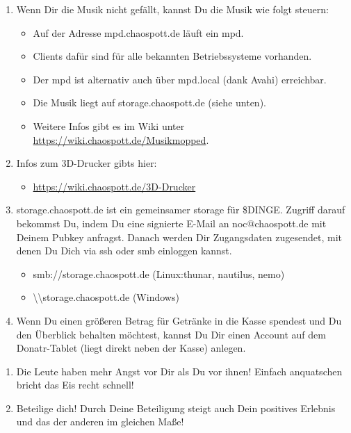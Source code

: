 \begin{enumerate}
	\item Wenn Dir die Musik nicht gefällt, kannst Du die Musik wie folgt steuern:
		\begin{itemize}
		  \item Auf der Adresse mpd.chaospott.de läuft ein mpd.
		  \item Clients dafür sind für alle bekannten Betriebssysteme vorhanden.
		  \item Der mpd ist alternativ auch über mpd.local (dank Avahi) erreichbar.
		  \item Die Musik liegt auf storage.chaospott.de (siehe unten).
		  \item Weitere Infos gibt es im Wiki unter \url{https://wiki.chaospott.de/Musikmopped}.
		\end{itemize}
	\item Infos zum 3D-Drucker gibts hier: 
		\begin{itemize}
		  \item \url{https://wiki.chaospott.de/3D-Drucker}
		\end{itemize}
	\item storage.chaospott.de ist ein gemeinsamer storage für \$DINGE. Zugriff darauf bekommst Du, indem Du eine signierte E-Mail an noc@chaospott.de mit Deinem Pubkey anfragst. Danach werden Dir Zugangsdaten zugesendet, mit denen Du Dich via ssh oder smb einloggen kannst. 
		\begin{itemize}
		  \item smb://storage.chaospott.de (Linux:thunar, nautilus, nemo)
		  \item \textbackslash\textbackslash storage.chaospott.de (Windows)
		\end{itemize}
	\item Wenn Du einen größeren Betrag für Getränke in die Kasse spendest und Du den Überblick behalten möchtest, kannst Du Dir einen Account auf dem Donatr-Tablet (liegt direkt neben der Kasse) anlegen.
	\end{enumerate}
	\begin{adjustwidth}{0.1cm}{1.5cm} 
		\begin{enumerate}[resume]
			\item Die Leute haben mehr Angst vor Dir als Du vor ihnen! Einfach anquatschen bricht das Eis recht schnell!
			\item Beteilige dich! Durch Deine Beteiligung steigt auch Dein positives Erlebnis und das der anderen im gleichen Maße!
		\end{enumerate}
	\end{adjustwidth}

